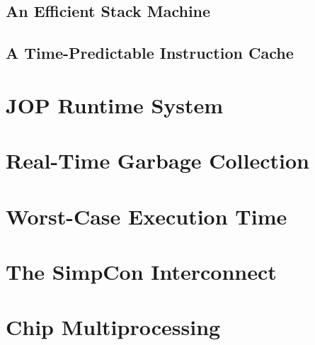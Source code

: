 \clearpage
    \section{An Efficient Stack Machine}
    \label{sec:stack}
    

\clearpage
    
\clearpage
    

\clearpage
    \section{A Time-Predictable Instruction Cache}
    \label{sec:cache}
    

\chapter{JOP Runtime System}
\label{chap:runtime}

    
    
    
    
\clearpage
    
    

\chapter{Real-Time Garbage Collection}
\label{chap:rtgc}
    

\chapter{Worst-Case Execution Time}
\label{chap:wcet}
    

\chapter{The SimpCon Interconnect}
\label{chap:simpcon}
\newcommand{\scgrsc}{.65}
\newcommand{\scgrp}{simpcon}



\chapter{Chip Multiprocessing}
\label{chap:cmp}



%

